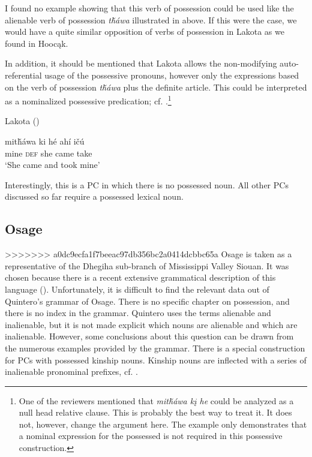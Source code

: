 \documentclass[output=paper]{LSP/langsci}
\begin{document}
I found no example showing that this verb of possession could be used like the alienable verb of possession \textit{t\v{h}\'awa} illustrated in  above. If this were the case, we would have a quite similar opposition of verbs of possession in Lakota as we found in Hoocąk. 

In addition, it should be mentioned that Lakota allows the non-modifying auto-referential usage of the possessive pronouns, however only the expressions based on the verb of possession \textit{t\v{h}\'awa} plus the definite article. This could be interpreted as a nominalized possessive predication; cf. .\footnote{One of the reviewers mentioned that \textit{mit\v{h}áwa kį he} could be analyzed as a null head relative clause. This is probably the best way to treat it. It does not, however, change the argument here. The example only demonstrates that a nominal expression for the possessed is not required in this possessive construction.}

\ea	Lakota (\citealt[22]{Buechel1939}) \label{lakotatookmine}

\gll mit\v{h}áwa ki      h\'e   ahí     i\v{c}ú \\
mine        \textsc{def} she came take \\
\glt `She came and took mine'
\z

Interestingly, this is a PC in which there is no possessed noun. All other PCs discussed so far require a possessed lexical noun.
 
\subsection{Osage}\label{sec:helmbrecht:4.5} \label{osage}
>>>>>>> a0dc9ecfa1f7beeac97db356bc2a0414dcbbc65a
Osage is taken as a representative of the Dhegiha sub-branch of Mississippi Valley Siouan. It was chosen because there is a recent extensive grammatical description of this language (\citealt{Quintero2004}). Unfortunately, it is difficult to find the relevant data out of Quintero's grammar of Osage. There is no specific chapter on possession, and there is no index in the grammar. Quintero uses the terms alienable and inalienable, but it is not made explicit which nouns are alienable and which are inalienable. However, some conclusions about this question can be drawn from the numerous examples provided by the grammar.
There is a special construction for PCs with possessed kinship nouns. Kinship nouns are inflected with a series of inalienable pronominal prefixes, cf. .
\end{document}
